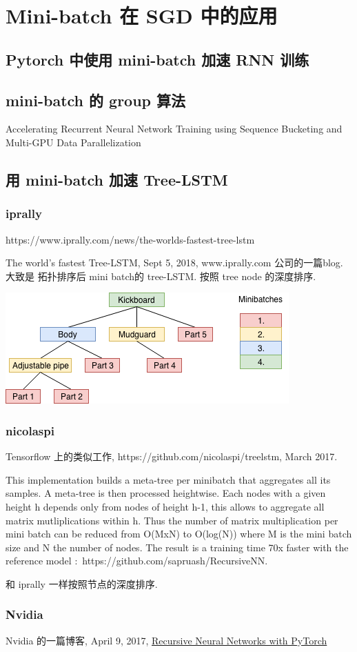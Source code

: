 
\section{Mini-batch 在 SGD 中的应用}


\subsection{Pytorch 中使用 mini-batch 加速 RNN 训练}

%

%
\subsection{mini-batch 的 group 算法}


Accelerating Recurrent Neural Network Training using Sequence Bucketing and
Multi-GPU Data Parallelization\cite{}

\subsection{用 mini-batch 加速 Tree-LSTM}

\subsubsection{iprally}

https://www.iprally.com/news/the-worlds-fastest-tree-lstm

The world’s fastest Tree-LSTM, Sept 5, 2018,
www.iprally.com 公司的一篇blog.
大致是 拓扑排序后 mini batch的 tree-LSTM. 按照 tree node 的深度排序.

\includegraphics[width=0.6\linewidth]{pytorch/pic/minibatch_order.png}

\subsubsection{nicolaspi}

Tensorflow 上的类似工作,
https://github.com/nicolaspi/treelstm, March 2017.

This implementation builds a meta-tree per minibatch that aggregates all its
samples. A meta-tree is then processed heightwise. Each nodes with a given
height h depends only from nodes of height h-1, this allows to aggregate all
matrix mutliplications within h. Thus the number of matrix multiplication per
mini batch can be reduced from O(MxN) to O(log(N)) where M is the mini batch
size and N the number of nodes. The result is a training time 70x faster with
the reference model : https://github.com/sapruash/RecursiveNN.

和 iprally 一样按照节点的深度排序.

\subsubsection{Nvidia}
Nvidia 的一篇博客, April 9, 2017,
\href{https://devblogs.nvidia.com/recursive-neural-networks-pytorch/}
{Recursive Neural Networks with PyTorch}



